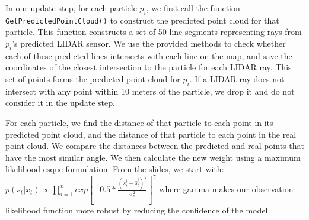 In our update step, for each particle $p_i$, we first call the function \texttt{GetPredictedPointCloud()} to construct the predicted point cloud for that particle. This function constructs a set of 50 line segments representing rays from $p_i$'s predicted LIDAR sensor. We use the provided methods to check whether each of these predicted lines intersects with each line on the map, and save the coordinates of the closest intersection to the particle for each LIDAR ray. This set of points forms the predicted point cloud for $p_i$. If a LIDAR ray does not intersect with any point within 10 meters of the particle, we drop it and do not consider it in the update step.


For each particle, we find the distance of that particle to each point in its predicted point cloud, and the distance of that particle to each point in the real point cloud. We compare the distances between the predicted and real points that have the most similar angle.
We then calculate the new weight using a maximum likelihood-esque formulation. From the slides, we start with: $p(s_t | x_t) \propto \prod_{i=1}^n exp[-0.5 * \frac{(s_t^i - \hat{s}_t^i)^2}{\sigma_s^2}]^\gamma$ where gamma makes our observation likelihood function more robust by reducing the confidence of the model. 

